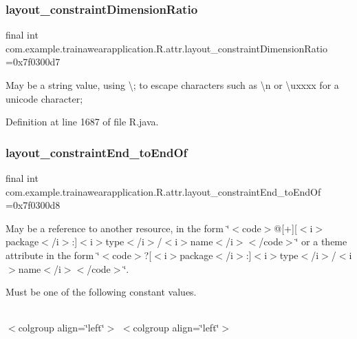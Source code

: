 \subsubsection{\texorpdfstring{layout\_constraintDimensionRatio}{layout\_constraintDimensionRatio}}
{\footnotesize\ttfamily final int com.\+example.\+trainawearapplication.\+R.\+attr.\+layout\+\_\+constraint\+Dimension\+Ratio =0x7f0300d7\hspace{0.3cm}{\ttfamily [static]}}

May be a string value, using \textquotesingle{}\textbackslash{};\textquotesingle{} to escape characters such as \textquotesingle{}\textbackslash{}n\textquotesingle{} or \textquotesingle{}\textbackslash{}uxxxx\textquotesingle{} for a unicode character; 

Definition at line 1687 of file R.\+java.

\mbox{\label{classcom_1_1example_1_1trainawearapplication_1_1_r_1_1attr_adf33cd682140f67e52f9397285432ea3}} 
\subsubsection{\texorpdfstring{layout\_constraintEnd\_toEndOf}{layout\_constraintEnd\_toEndOf}}
{\footnotesize\ttfamily final int com.\+example.\+trainawearapplication.\+R.\+attr.\+layout\+\_\+constraint\+End\+\_\+to\+End\+Of =0x7f0300d8\hspace{0.3cm}{\ttfamily [static]}}

May be a reference to another resource, in the form \char`\"{}$<$code$>$@\mbox{[}+\mbox{]}\mbox{[}$<$i$>$package$<$/i$>$\+:\mbox{]}$<$i$>$type$<$/i$>$/$<$i$>$name$<$/i$>$$<$/code$>$\char`\"{} or a theme attribute in the form \char`\"{}$<$code$>$?\mbox{[}$<$i$>$package$<$/i$>$\+:\mbox{]}$<$i$>$type$<$/i$>$/$<$i$>$name$<$/i$>$$<$/code$>$\char`\"{}. 

Must be one of the following constant values.

\tabulinesep=1mm
\begin{longtabu}spread 0pt [c]{*{0}{|X[-1]}|}
\hline
\end{longtabu}
$<$colgroup align=\char`\"{}left\char`\"{}$>$ $<$colgroup align=\char`\"{}left\char`\"{}$>$ 


